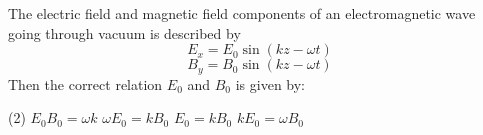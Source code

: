 \item The electric field and magnetic field components of an electromagnetic wave going through vacuum is described by
    \[
    E_x = E_0 \sin(kz - \omega t)
    \]
    \[
    B_y = B_0 \sin(kz - \omega t)
    \]
    Then the correct relation \( E_0 \) and \( B_0 \) is given by:
    \begin{tasks}(2)
        \task \( E_0 B_0 = \omega k \)
        \task \( \omega E_0 = k B_0 \)
        \task \( E_0 = k B_0 \)
        \task \( k E_0 = \omega B_0 \)
    \end{tasks}